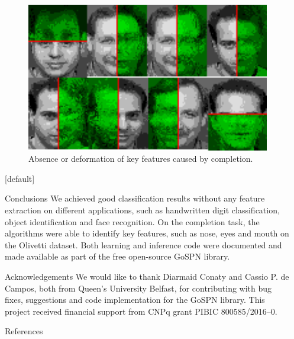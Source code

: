 \documentclass[final,hyperref={pdfpagelabels=false},notheorems]{beamer}
\theoremstyle{thesisstyle}
\begin{document}
\begin{frame}[t]
\begin{columns}[t]
\begin{column}{.5225\textwidth}
\begin{block}{}
      \begin{figure}[h]
        \centering\includegraphics[width=40cm]{imgs/notfine.png}
        \caption{Absence or deformation of key features caused by completion.}
      \end{figure}
    \end{block}
    [default]

    \begin{block}{Conclusions}
      We achieved good classification results without any feature extraction on different
      applications, such as handwritten digit classification, object identification and face
      recognition. On the completion task, the algorithms were able to identify key features, such
      as nose, eyes and mouth on the Olivetti dataset. Both learning and inference code were
      documented and made available as part of the free open-source GoSPN library.
    \end{block}

    \begin{block}{Acknowledgements}
      We would like to thank Diarmaid Conaty and Cassio P. de Campos, both from Queen's University
      Belfast, for contributing with bug fixes, suggestions and code implementation for the GoSPN
      library. This project received financial support from CNPq grant PIBIC 800585/2016--0.
    \end{block}

    \begin{block}{References}
      \linespread{0.928}\selectfont
      \printbibliography[heading=none]
    \end{block}

  \end{column}

  \begin{column}{.015\textwidth}\end{column} %

\end{columns} %

\end{frame} %
\end{document}
